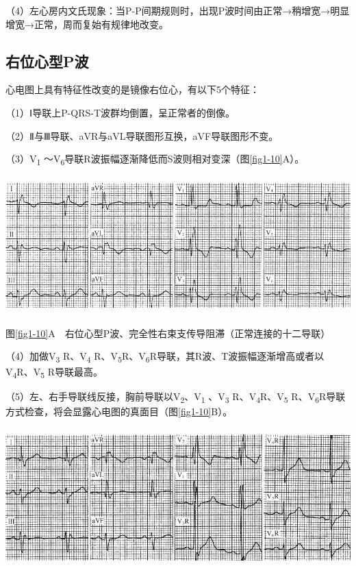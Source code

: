 （4）左心房内文氏现象：当P-P间期规则时，出现P波时间由正常→稍增宽→明显增宽→正常，周而复始有规律地改变。

\protect\hypertarget{text00007.htmlux5cux23subid10}{}{}

\subsection{右位心型P波}

心电图上具有特征性改变的是镜像右位心，有以下5个特征：

（1）Ⅰ导联上P-QRS-T波群均倒置，呈正常者的倒像。

（2）Ⅱ与Ⅲ导联、aVR与aVL导联图形互换，aVF导联图形不变。

（3）V\textsubscript{1} ～V\textsubscript{6}导联R波振幅逐渐降低而S波则相对变深（图\ref{fig1-10}A）。

\includegraphics[width=5.78125in,height=2.08333in]{./images/Image00015.jpg}

图\ref{fig1-10}A　右位心型P波、完全性右束支传导阻滞（正常连接的十二导联）

（4）加做V\textsubscript{3} R、V\textsubscript{4} R、V\textsubscript{5}R、V\textsubscript{6}R导联，其R波、T波振幅逐渐增高或者以V\textsubscript{4}R、V\textsubscript{5} R导联最高。

（5）左、右手导联线反接，胸前导联以V\textsubscript{2}、V\textsubscript{1} 、V\textsubscript{3} R、V\textsubscript{4}R、V\textsubscript{5} R、V\textsubscript{6}R导联方式检查，将会显露心电图的真面目（图\ref{fig1-10}B）。

\includegraphics[width=5.78125in,height=2.11458in]{./images/Image00016.jpg}

